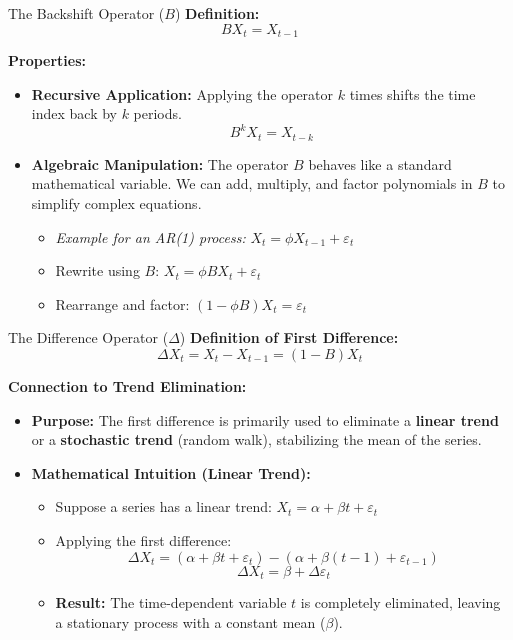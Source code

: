 \documentclass[aspectratio=169]{beamer}
\begin{document}
\begin{frame}{The Backshift Operator ($B$)}
\textbf{Definition:}
\[
B X_t = X_{t-1}
\]

\textbf{Properties:}
\begin{itemize}
    \item \textbf{Recursive Application:} Applying the operator $k$ times shifts the time index back by $k$ periods.
    \[ B^k X_t = X_{t-k} \]
    
    \vspace{0.2cm}
    
    \item \textbf{Algebraic Manipulation:} The operator $B$ behaves like a standard mathematical variable. We can add, multiply, and factor polynomials in $B$ to simplify complex equations.
    \begin{itemize}
        \item \textit{Example for an AR(1) process:} $X_t = \phi X_{t-1} + \varepsilon_t$
        \item Rewrite using $B$: $X_t = \phi B X_t + \varepsilon_t$
        \item Rearrange and factor: $(1 - \phi B)X_t = \varepsilon_t$
    \end{itemize}
\end{itemize}
\end{frame}

\begin{frame}{The Difference Operator ($\Delta$)}
\textbf{Definition of First Difference:}
\[
\Delta X_t = X_t - X_{t-1} = (1 - B)X_t
\]

\textbf{Connection to Trend Elimination:}
\begin{itemize}
    \item \textbf{Purpose:} The first difference is primarily used to eliminate a \textbf{linear trend} or a \textbf{stochastic trend} (random walk), stabilizing the mean of the series.
    \vspace{0.2cm}
    \item \textbf{Mathematical Intuition (Linear Trend):}
    \begin{itemize}
        \item Suppose a series has a linear trend: $X_t = \alpha + \beta t + \varepsilon_t$
        \item Applying the first difference:
        \[ \Delta X_t = (\alpha + \beta t + \varepsilon_t) - (\alpha + \beta(t-1) + \varepsilon_{t-1}) \]
        \[ \Delta X_t = \beta + \Delta \varepsilon_t \]
        \item \textbf{Result:} The time-dependent variable $t$ is completely eliminated, leaving a stationary process with a constant mean ($\beta$).
    \end{itemize}
\end{itemize}
\end{frame}
\end{document}
